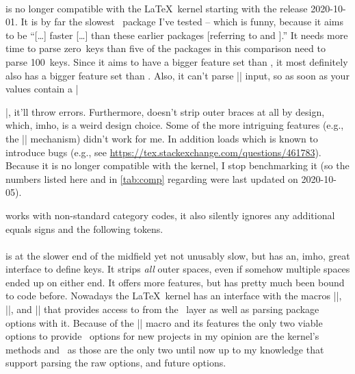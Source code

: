 \paragraph{} is no longer compatible with the \LaTeX\ kernel
starting with the release 2020-10-01. It is by far the slowest \kv\ package I've
tested -- which is funny, because it aims to be ``[\ldots] faster [\ldots] than
these earlier packages [referring to  and ].'' It needs
more time to parse zero~keys than five of the packages in this comparison need
to parse 100~keys.  Since it aims to have a bigger feature set than
, it most definitely also has a bigger feature set than \expkv.
Also, it can't parse |\long| input, so as soon as your values contain a |\par|,
it'll throw errors.  Furthermore,  doesn't strip outer braces at
all by design, which, imho, is a weird design choice. Some of the more
intriguing features (e.g., the |\argpattern| mechanism) didn't work for me. In
addition  loads  which is known to introduce bugs
(e.g., see \url{https://tex.stackexchange.com/questions/461783}). Because it is
no longer compatible with the kernel, I stop benchmarking it (so the numbers
listed here and in \autoref{tab:comp} regarding  were last updated
on 2020-10-05).

 works with non-standard category codes, it also silently ignores
any additional equals signs and the following tokens.

\paragraph{} is at the slower end of the midfield yet not unusably
slow, but has an, imho, great interface to define keys. It strips \emph{all}
outer spaces, even if somehow multiple spaces ended up on either end. It offers
more features, but has pretty much been bound to  code before.
Nowadays the \LaTeX\ kernel has an interface with the macros |\DeclareKeys|,
|\SetKeys|, and |\ProcessKeyOptions| that provides access to  from
the \LaTeXe\ layer as well as parsing package options with it. Because of the
|\ProcessKeyOptions| macro and its features the only two viable options to
provide \kv\ options for new projects in my opinion are the kernel's methods and
\expkvo\ as those are the only two until now up to my knowledge that support
parsing the raw options, and future options.

